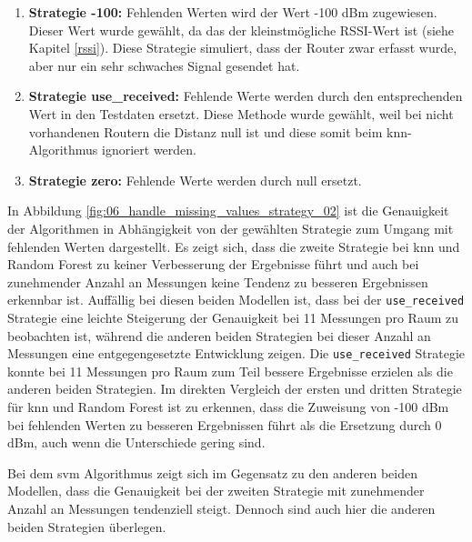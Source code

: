 \begin{enumerate}
    \item \textbf{Strategie -100:} Fehlenden Werten wird der Wert -100 dBm zugewiesen. Dieser Wert wurde gewählt, da das der kleinstmögliche RSSI-Wert ist (siehe Kapitel \ref{rssi}). Diese Strategie simuliert, dass der Router zwar erfasst wurde, aber nur ein sehr schwaches Signal gesendet hat.
    \item \textbf{Strategie use\_received:} Fehlende Werte werden durch den entsprechenden Wert in den Testdaten ersetzt. Diese Methode wurde gewählt, weil bei nicht vorhandenen Routern die Distanz null ist und diese somit beim \gls{knn}-Algorithmus ignoriert werden.
    \item \textbf{Strategie zero:} Fehlende Werte werden durch null ersetzt.
\end{enumerate}

In Abbildung \ref{fig:06_handle_missing_values_strategy_02} ist die Genauigkeit der Algorithmen in Abhängigkeit von der gewählten Strategie zum Umgang mit fehlenden Werten dargestellt. Es zeigt sich, dass die zweite Strategie bei \gls{knn} und Random Forest zu keiner Verbesserung der Ergebnisse führt und auch bei zunehmender Anzahl an Messungen keine Tendenz zu besseren Ergebnissen erkennbar ist. Auffällig bei diesen beiden Modellen ist, dass bei der \texttt{use\_received} Strategie eine leichte Steigerung der Genauigkeit bei 11 Messungen pro Raum zu beobachten ist, während die anderen beiden Strategien bei dieser Anzahl an Messungen eine entgegengesetzte Entwicklung zeigen. Die \texttt{use\_received} Strategie konnte bei 11 Messungen pro Raum zum Teil bessere Ergebnisse erzielen als die anderen beiden Strategien. Im direkten Vergleich der ersten und dritten Strategie für \gls{knn} und Random Forest ist zu erkennen, dass die Zuweisung von -100 dBm bei fehlenden Werten zu besseren Ergebnissen führt als die Ersetzung durch 0 dBm, auch wenn die Unterschiede gering sind.

Bei dem \gls{svm} Algorithmus zeigt sich im Gegensatz zu den anderen beiden Modellen, dass die Genauigkeit bei der zweiten Strategie mit zunehmender Anzahl an Messungen tendenziell steigt. Dennoch sind auch hier die anderen beiden Strategien überlegen.

